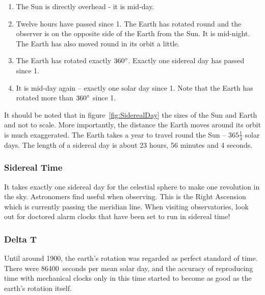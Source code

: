 \begin{enumerate}
\item
  The Sun is directly overhead - it is mid-day.
\item
  Twelve hours have passed since 1. The Earth has rotated round and the
  observer is on the opposite side of the Earth from the Sun. It is
  mid-night. The Earth has also moved round in its orbit a little.
\item
  The Earth has rotated exactly $360\degree$. Exactly one sidereal day has
  passed since 1.
\item
  It is mid-day again -- exactly one solar day since 1. Note that the
  Earth has rotated more than $360\degree$ since 1.
\end{enumerate}

It should be noted that in figure~\ref{fig:SiderealDay} the sizes of
the Sun and Earth and not to scale. More importantly, the distance the
Earth moves around its orbit is much exaggerated. The Earth takes a
year to travel round the Sun --
$365\frac{1}{4}$ solar days. The length of a
sidereal day is about 23 hours, 56 minutes and 4 seconds.

\subsubsection{Sidereal Time}
\label{sec:Concepts:SiderealTime}

It takes exactly one sidereal day for the celestial sphere to make one
revolution in the sky. Astronomers find 
useful when observing. This is the Right Ascension which is currently
passing the meridian line.  When visiting observatories, look out for
doctored alarm clocks that have been set to run in sidereal time!

\subsubsection{Delta T}
\label{sec:Concepts:DeltaT}

Until around 1900, the earth's rotation was regarded as perfect
standard of time. There were 86400~seconds per mean solar day, and the
accuracy of reproducing time with mechanical clocks only in this time
started to become as good as the earth's rotation itself.


